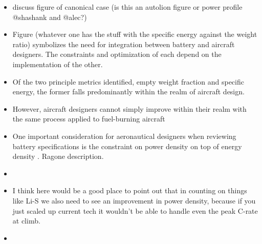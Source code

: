 \begin{itemize}
    \item discuss figure of canonical case (is this an autolion figure or power profile @shashank and @alec?)
    \item Figure (whatever one has the stuff with the specific energy against the weight ratio) symbolizes the need for integration between battery and aircraft designers. The constraints and optimization of each depend on the implementation of the other.
    \item Of the two principle metrics identified, empty weight fraction and specific energy, the former falls predominantly within the realm of aircraft design.
    \item However, aircraft designers cannot simply improve within their realm with the same process applied to fuel-burning aircraft
    \item One important consideration for aeronautical designers when reviewing battery specifications is the constraint on power density on top of energy density . Ragone description. 
    \item {}
    \item I think here would be a good place to point out that in counting on things like Li-S we also need to see an improvement in power density, because if you just scaled up current tech it wouldn't be able to handle even the peak C-rate at climb.  
    \item {}

\end{itemize}

